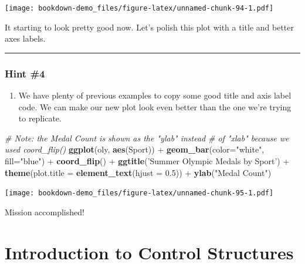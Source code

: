 \documentclass[]{book}
\newenvironment{Shaded}{\begin{snugshade}}{\end{snugshade}}
\newcommand{\KeywordTok}[1]{\textcolor[rgb]{0.13,0.29,0.53}{\textbf{{#1}}}}
\newcommand{\DataTypeTok}[1]{\textcolor[rgb]{0.13,0.29,0.53}{{#1}}}
\newcommand{\FloatTok}[1]{\textcolor[rgb]{0.00,0.00,0.81}{{#1}}}
\newcommand{\StringTok}[1]{\textcolor[rgb]{0.31,0.60,0.02}{{#1}}}
\newcommand{\CommentTok}[1]{\textcolor[rgb]{0.56,0.35,0.01}{\textit{{#1}}}}
\newcommand{\NormalTok}[1]{{#1}}
\providecommand{\tightlist}{%
  \setlength{\itemsep}{0pt}\setlength{\parskip}{0pt}}
\begin{document}
\texttt{[image: bookdown-demo\_files/figure-latex/unnamed-chunk-94-1.pdf]}

It starting to look pretty good now. Let's polish this plot with a title
and better axes labels.

\begin{center}\rule{0.5\linewidth}{\linethickness}\end{center}

\subsection{Hint \#4}\label{hint-4}

\begin{enumerate}
\def\labelenumi{\arabic{enumi})}
\setcounter{enumi}{3}
\tightlist
\item
  We have plenty of previous examples to copy some good title and axis
  label code. We can make our new plot look even better than the one
  we're trying to replicate.
\end{enumerate}

\begin{Shaded}
\begin{Highlighting}[]
\CommentTok{# Note: the Medal Count is shown as the "ylab" instead }
\CommentTok{# of "xlab" because we used coord_flip()}
\KeywordTok{ggplot}\NormalTok{(oly, }\KeywordTok{aes}\NormalTok{(Sport)) +}\StringTok{ }\KeywordTok{geom_bar}\NormalTok{(}\DataTypeTok{color=}\StringTok{"white"}\NormalTok{, }\DataTypeTok{fill=}\StringTok{"blue"}\NormalTok{) +}\StringTok{ }\KeywordTok{coord_flip}\NormalTok{() +}
\StringTok{  }\KeywordTok{ggtitle}\NormalTok{(}\StringTok{'Summer Olympic Medals by Sport'}\NormalTok{) +}\StringTok{ }
\StringTok{  }\KeywordTok{theme}\NormalTok{(}\DataTypeTok{plot.title =} \KeywordTok{element_text}\NormalTok{(}\DataTypeTok{hjust =} \FloatTok{0.5}\NormalTok{)) +}\StringTok{ }
\StringTok{  }\KeywordTok{ylab}\NormalTok{(}\StringTok{"Medal Count"}\NormalTok{)}
\end{Highlighting}
\end{Shaded}

\texttt{[image: bookdown-demo\_files/figure-latex/unnamed-chunk-95-1.pdf]}

Mission accomplished!

\chapter{Introduction to Control
Structures}\label{introduction-to-control-structures}
\end{document}
